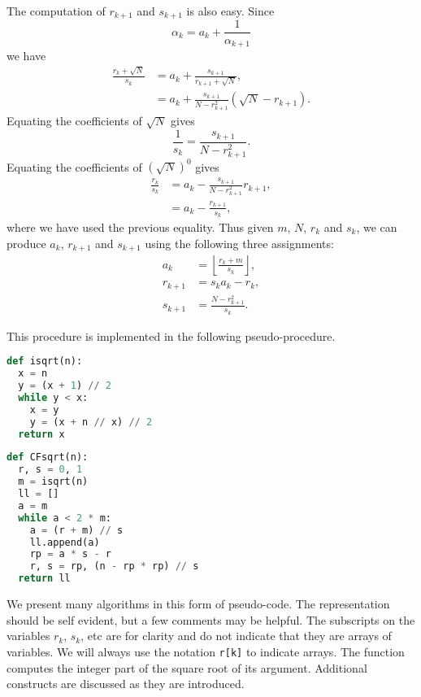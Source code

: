 The computation of $r_{k+1}$ and $s_{k+1}$ is also easy.  Since
\[
\alpha_k = a_k + \frac{1}{\alpha_{k+1}}
\]
we have
\[
\begin{aligned}
\frac{r_k + \sqrt{N}}{s_k} 
  & = a_k + \frac{s_{k+1}}{r_{k+1}+\sqrt{N}}, \\
  & = a_k + \frac{s_{k+1}}{N - r_{k+1}^2} \left( \sqrt{N} -
r_{k+1}\right).
\end{aligned}
\]
Equating the coefficients of $\sqrt{N}$ gives
\[
\frac{1}{s_k} = \frac{s_{k+1}}{N - r_{k+1}^2}.
\]
Equating the coefficients of $(\sqrt{N})^0$ gives
\[
\begin{aligned}
  \frac{r_{k}}{s_{k}} & = a_k - \frac{s_{k+1}}{N - r_{k+1}^2} r_{k+1}, \\
      & = a_k - \frac{r_{k+1}}{s_k},
\end{aligned}
\]
where we have used the previous equality.  Thus given $m$, $N$, $r_k$
and $s_k$, we can produce $a_k$, $r_{k+1}$ and $s_{k+1}$ using the
following three assignments:
\[
\begin{aligned}
 a_k &= \displaystyle \left\lfloor \frac{r_k + m}{s_k} \right\rfloor, \\
 r_{k+1} & = s_k a_k - r_k, \\
 s_{k+1} & = \frac{N - r_{k+1}^2}{s_k}.
\end{aligned}
\]

This procedure is implemented  in the following
pseudo-procedure.

\begin{lstlisting}[language=Python]
def isqrt(n):
  x = n
  y = (x + 1) // 2
  while y < x:
    x = y
    y = (x + n // x) // 2
  return x
\end{lstlisting}

\begin{lstlisting}[language=Python]
def CFsqrt(n):
  r, s = 0, 1
  m = isqrt(n)
  ll = []
  a = m
  while a < 2 * m:
    a = (r + m) // s
    ll.append(a)
    rp = a * s - r
    r, s = rp, (n - rp * rp) // s
  return ll
\end{lstlisting}


We present many algorithms in this form of pseudo-code.  The
representation should be self evident, but a few comments may be
helpful.  The subscripts on the variables $r_k$, $s_k$, etc are for
clarity and do not indicate that they are arrays of variables.  We
will always use the notation {\tt r[k]} to indicate arrays.  The
function  computes the integer part of the square root of
its argument.  Additional constructs are discussed as they are
introduced.


